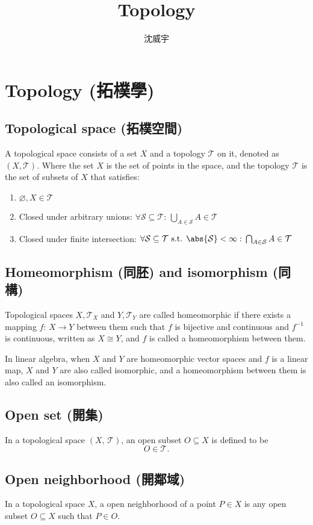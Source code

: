 \documentclass[a4paper,12pt]{article}
\begin{document}
\title{Topology}
\author{沈威宇}
\date{\temtoday}
\titletocdoc
\section{Topology (拓樸學)}
\subsection{Topological space (拓樸空間)}
A topological space consists of a set $X$ and a topology $\mathcal{T}$ on it, denoted as \( (X, \mathcal{T}) \). Where the set \( X \) is the set of points in the space, and the topology \( \mathcal{T} \) is the set of subsets of \( X \) that satisfies:
\begin{enumerate}
\item \(\varnothing,X\in\mathcal{T} \)
\item Closed under arbitrary unions: \(\forall\mathcal{S}\subseteq\mathcal{T}:\,\bigcup_{A\in\mathcal{S}}A\in\mathcal{T}\)
\item Closed under finite intersection: \(\forall\mathcal{S}\subseteq\mathcal{T}\text{ s.t. }\abs{\mathcal{S}}<\infty:\,\bigcap_{A\in\mathcal{S}}A\in\mathcal{T}\)
\end{enumerate}
\subsection{Homeomorphism (同胚) and isomorphism (同構)}
Topological spaces ${X,\mathcal{T}_X}$ and ${Y,\mathcal{T}_Y}$ are called homeomorphic if there exists a mapping $f:\,X\rightarrow Y$ between them such that $f$ is bijective and continuous and $f^{-1}$ is continuous, written as \( X \cong Y \), and $f$ is called a homeomorphism between them.

In linear algebra, when $X$ and $Y$ are homeomorphic vector spaces and $f$ is a linear map, $X$ and $Y$ are also called isomorphic, and a homeomorphism between them is also called an isomorphism.
\subsection{Open set (開集)}
In a topological space \( (X, \,\mathcal{T}) \), an open subset \( O \subseteq X \) is defined to be
\[O\in \mathcal{T}.\]
\subsection{Open neighborhood (開鄰域)}
In a topological space $X$, a open neighborhood of a point $P\in X$ is any open subset $O\subseteq X$ such that $P\in O$.
\end{document}

